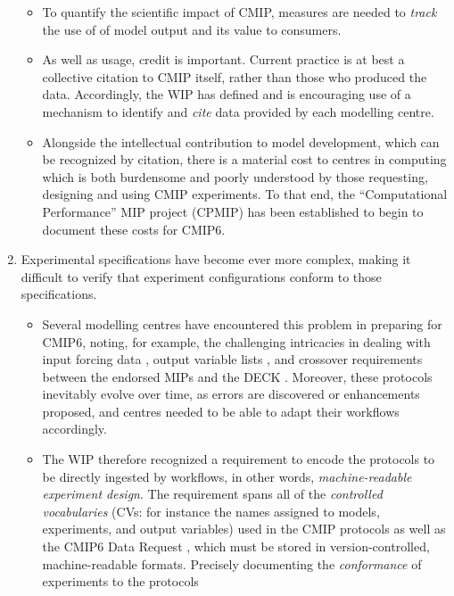 \documentclass[gmd,manuscript]{copernicus}
\newcommand{\pipref}[1] {\citep{ref:#1}}
\begin{document}
\begin{enumerate}
  \begin{itemize}
  \item To quantify the scientific impact of CMIP, measures are needed
    to \emph{track} the use of of model output and its value to
    consumers.
  \item As well as usage, credit is important. Current practice is at
    best a collective citation to CMIP itself, rather than those who
    produced the data. Accordingly, the WIP has defined and is
    encouraging use of a mechanism to identify and \emph{cite} data
    provided by each modelling centre.
  \item Alongside the intellectual contribution to model development,
    which can be recognized by citation, there is a material cost to
    centres in computing which is both burdensome and poorly
    understood by those requesting, designing and using CMIP
    experiments. To that end, the ``Computational Performance'' MIP
    project (CPMIP) \pipref{balajietal2017} has been established to begin to
    document these costs for CMIP6.
  \end{itemize}
\item\label{cmplx} Experimental specifications have become ever more
  complex, making it difficult to verify that experiment
  configurations conform to those specifications.
 \begin{itemize} 
 \item Several modelling centres have encountered this problem in
   preparing for CMIP6, noting, for example, the challenging
   intricacies in dealing with input forcing data
   \citep[see][]{ref:duracketal2017}, output variable lists
   \pipref{juckesetal2015}, and crossover requirements between the
   endorsed MIPs and the DECK \pipref{eyringetal2016a} . Moreover,
   these protocols inevitably evolve over time, as errors are
   discovered or enhancements proposed, and centres needed to be able
   to adapt their workflows accordingly.
 \item The WIP therefore recognized a requirement to encode the
   protocols to be directly ingested by workflows, in other words,
   \emph{machine-readable experiment design}. The requirement spans
   all of the \emph{controlled vocabularies} (CVs: for instance the
   names assigned to models, experiments, and output variables) used
   in the CMIP protocols as well as the CMIP6 Data Request
   \pipref{juckesetal2015}, which must be stored in
   version-controlled, machine-readable formats. Precisely documenting
   the \emph{conformance} of experiments to the protocols

\end{itemize}
\end{enumerate}
\end{document}
